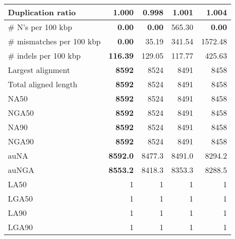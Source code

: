 \documentclass[12pt,a4paper]{article}
\begin{document}
\begin{table}[ht]
\begin{center}
\begin{tabular}{|l*{4}{|r}|}
Duplication ratio & 1.000 & {\bf 0.998} & 1.001 & 1.004 \\ \hline
\# N's per 100 kbp & {\bf 0.00} & {\bf 0.00} & 565.30 & {\bf 0.00} \\ \hline
\# mismatches per 100 kbp & {\bf 0.00} & 35.19 & 341.54 & 1572.48 \\ \hline
\# indels per 100 kbp & {\bf 116.39} & 129.05 & 117.77 & 425.63 \\ \hline
Largest alignment & {\bf 8592} & 8524 & 8491 & 8458 \\ \hline
Total aligned length & {\bf 8592} & 8524 & 8491 & 8458 \\ \hline
NA50 & {\bf 8592} & 8524 & 8491 & 8458 \\ \hline
NGA50 & {\bf 8592} & 8524 & 8491 & 8458 \\ \hline
NA90 & {\bf 8592} & 8524 & 8491 & 8458 \\ \hline
NGA90 & {\bf 8592} & 8524 & 8491 & 8458 \\ \hline
auNA & {\bf 8592.0} & 8477.3 & 8491.0 & 8294.2 \\ \hline
auNGA & {\bf 8553.2} & 8418.3 & 8353.3 & 8288.5 \\ \hline
LA50 & 1 & 1 & 1 & 1 \\ \hline
LGA50 & 1 & 1 & 1 & 1 \\ \hline
LA90 & 1 & 1 & 1 & 1 \\ \hline
LGA90 & 1 & 1 & 1 & 1 \\ \hline
\end{tabular}
\end{center}
\end{table}
\end{document}
